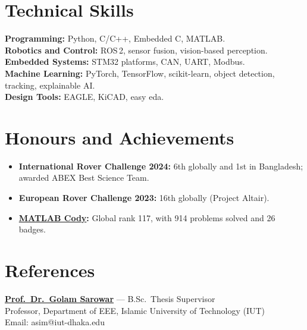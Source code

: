\documentclass[10pt]{article}
\begin{document}
\begin{itemize}[label={}, leftmargin=0pt, itemsep=5pt]

\end{itemize}

\vspace{-3pt}
\section*{Technical Skills}
\vspace{-3pt}
\textbf{Programming:} Python, C/C++, Embedded C, MATLAB. \\
\textbf{Robotics and Control:} ROS\,2, sensor fusion, vision-based perception. \\
\textbf{Embedded Systems:} STM32 platforms, CAN, UART, Modbus.\\
\textbf{Machine Learning:} PyTorch, TensorFlow, scikit-learn, object detection, tracking,
explainable AI. \\
\textbf{Design Tools:} EAGLE, KiCAD, easy eda.
\section*{Honours and Achievements}
\begin{itemize}
    \item \textbf{International Rover Challenge 2024:} 6th globally and 1st in Bangladesh; awarded
    ABEX Best Science Team. 
    \item \textbf{European Rover Challenge 2023:} 16th globally (Project Altair).
    \item \textbf{\href{https://www.mathworks.com/matlabcentral/profile/authors/25804044}{MATLAB
    Cody}:} Global rank 117, with 914 problems solved and 26 badges.
\end{itemize}

\section*{References}
\textbf{\href{https://scholar.google.com/citations?hl=en\&user=3waAWaYAAAAJ\&view_op=list_works\&sortby=pubdate}{Prof.\ Dr.\ Golam Sarowar}} --- B.Sc.\ Thesis Supervisor \\
Professor, Department of EEE, Islamic University of Technology (IUT) \\ 
Email: asim@iut-dhaka.edu
\end{document}
